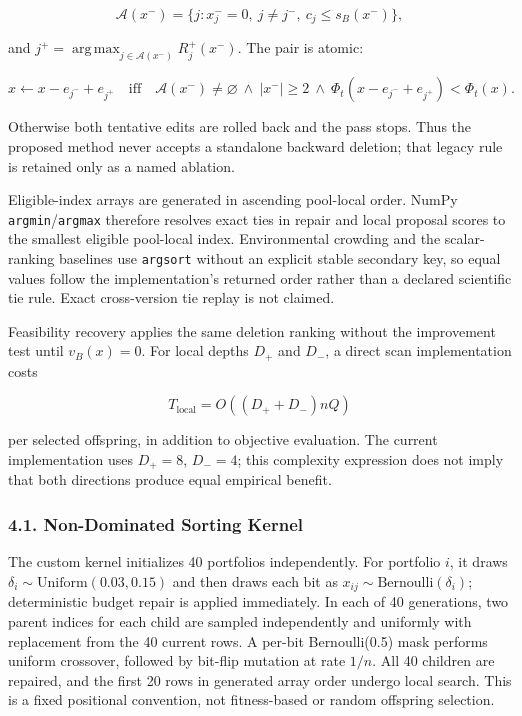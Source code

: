 \documentclass[
]{article}
\begin{document}
\[
\mathcal A(x^-)=\{j:x^-_j=0,\ j\neq j^-,\ c_j\leq s_B(x^-)\},
\]

and \(j^+=\operatorname*{arg\,max}_{j\in\mathcal A(x^-)}R_j^+(x^-)\). The pair is atomic:

\[
x\leftarrow x-e_{j^-}+e_{j^+}
\quad\text{iff}\quad
\mathcal A(x^-)\neq\varnothing\ \land\ |x^-|\geq2\ \land\
\Phi_t(x-e_{j^-}+e_{j^+})<\Phi_t(x).
\]

Otherwise both tentative edits are rolled back and the pass stops. Thus the proposed method never accepts a standalone backward deletion; that legacy rule is retained only as a named ablation.

Eligible-index arrays are generated in ascending pool-local order. NumPy \texttt{argmin}/\texttt{argmax} therefore resolves exact ties in repair and local proposal scores to the smallest eligible pool-local index. Environmental crowding and the scalar-ranking baselines use \texttt{argsort} without an explicit stable secondary key, so equal values follow the implementation's returned order rather than a declared scientific tie rule. Exact cross-version tie replay is not claimed.

Feasibility recovery applies the same deletion ranking without the improvement test until \(v_B(x)=0\). For local depths \(D_+\) and \(D_-\), a direct scan implementation costs

\[
T_{\mathrm{local}}=O\!\left((D_++D_-)nQ\right)
\]

per selected offspring, in addition to objective evaluation. The current implementation uses \(D_+=8\), \(D_-=4\); this complexity expression does not imply that both directions produce equal empirical benefit.

\subsubsection{4.1. Non-Dominated Sorting Kernel}\label{non-dominated-sorting-kernel}

The custom kernel initializes 40 portfolios independently. For portfolio \(i\), it draws \(\delta_i\sim\mathrm{Uniform}(0.03,0.15)\) and then draws each bit as \(x_{ij}\sim\mathrm{Bernoulli}(\delta_i)\); deterministic budget repair is applied immediately. In each of 40 generations, two parent indices for each child are sampled independently and uniformly with replacement from the 40 current rows. A per-bit Bernoulli(0.5) mask performs uniform crossover, followed by bit-flip mutation at rate \(1/n\). All 40 children are repaired, and the first 20 rows in generated array order undergo local search. This is a fixed positional convention, not fitness-based or random offspring selection.
\end{document}
